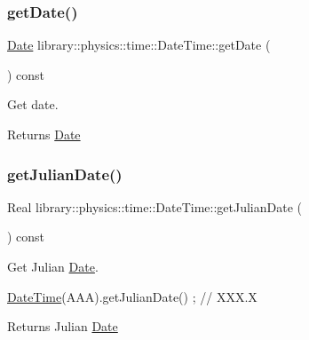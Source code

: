\subsubsection{\texorpdfstring{get\+Date()}{getDate()}}
{\footnotesize\ttfamily \hyperlink{classlibrary_1_1physics_1_1time_1_1_date}{Date} library\+::physics\+::time\+::\+Date\+Time\+::get\+Date (\begin{DoxyParamCaption}{ }\end{DoxyParamCaption}) const}



Get date. 

\begin{DoxyReturn}{Returns}
\hyperlink{classlibrary_1_1physics_1_1time_1_1_date}{Date} 
\end{DoxyReturn}
\mbox{\label{classlibrary_1_1physics_1_1time_1_1_date_time_aea64945314a4dd75f0f8fd0fea9c5c33}} 
\subsubsection{\texorpdfstring{get\+Julian\+Date()}{getJulianDate()}}
{\footnotesize\ttfamily Real library\+::physics\+::time\+::\+Date\+Time\+::get\+Julian\+Date (\begin{DoxyParamCaption}{ }\end{DoxyParamCaption}) const}



Get Julian \hyperlink{classlibrary_1_1physics_1_1time_1_1_date}{Date}. 


\begin{DoxyCode}
\hyperlink{classlibrary_1_1physics_1_1time_1_1_date_time_a4ea629e533f335c928e037c4ead4646e}{DateTime}(AAA).getJulianDate() ; \textcolor{comment}{// XXX.X}
\end{DoxyCode}


\begin{DoxyReturn}{Returns}
Julian \hyperlink{classlibrary_1_1physics_1_1time_1_1_date}{Date} 
\end{DoxyReturn}
\mbox{\label{classlibrary_1_1physics_1_1time_1_1_date_time_a9c624dbbdd13c81d96f0492eae0d1e2f}} 
